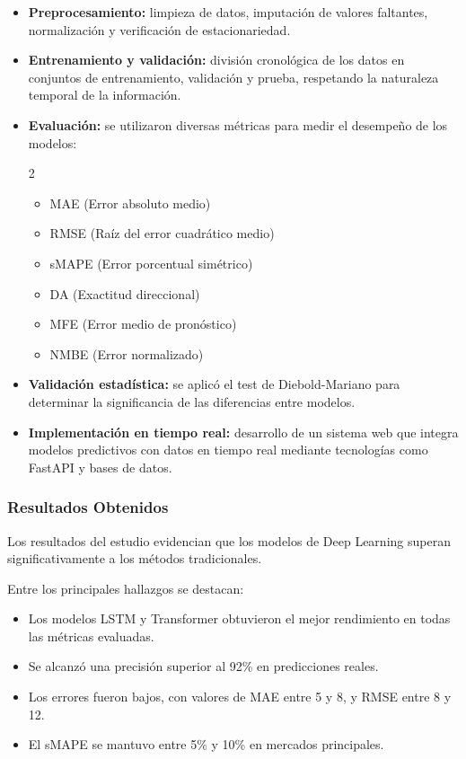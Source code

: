 \begin{itemize}
    \item \textbf{Preprocesamiento:} limpieza de datos, imputación de valores faltantes, normalización y verificación de estacionariedad.
    
    \item \textbf{Entrenamiento y validación:} división cronológica de los datos en conjuntos de entrenamiento, validación y prueba, respetando la naturaleza temporal de la información.
    
    \item \textbf{Evaluación:} se utilizaron diversas métricas para medir el desempeño de los modelos:
    
	\begin{multicols}{2}
	\begin{itemize}
        \item MAE (Error absoluto medio)
        \item RMSE (Raíz del error cuadrático medio)
        \item sMAPE (Error porcentual simétrico)
        \item DA (Exactitud direccional)
        \item MFE (Error medio de pronóstico)
        \item NMBE (Error normalizado)
    \end{itemize}
	\end{multicols}
    
    \item \textbf{Validación estadística:} se aplicó el test de Diebold-Mariano para determinar la significancia de las diferencias entre modelos.
    
    \item \textbf{Implementación en tiempo real:} desarrollo de un sistema web que integra modelos predictivos con datos en tiempo real mediante tecnologías como FastAPI y bases de datos.
\end{itemize}

\subsubsection{Resultados Obtenidos}

Los resultados del estudio evidencian que los modelos de Deep Learning superan significativamente a los métodos tradicionales.

Entre los principales hallazgos se destacan:

	\begin{itemize}
		\item Los modelos LSTM y Transformer obtuvieron el mejor rendimiento en todas las métricas evaluadas.
		\item Se alcanzó una precisión superior al 92\% en predicciones reales.
		\item Los errores fueron bajos, con valores de MAE entre 5 y 8, y RMSE entre 8 y 12.
		\item El sMAPE se mantuvo entre 5\% y 10\% en mercados principales.
	\end{itemize}

